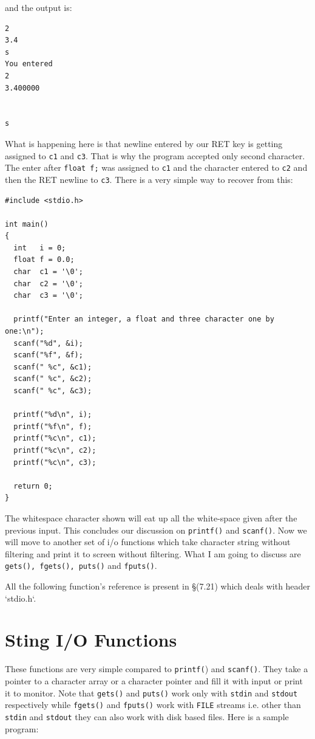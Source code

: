 and the output is:

\begin{Verbatim}[frame=single]
2
3.4
s
You entered
2
3.400000


s
\end{Verbatim}

What is happening here is that newline entered by our RET key is getting
assigned to \texttt{c1} and \texttt{c3}. That is why the program accepted only
second character. The enter after \texttt{float f;} was assigned to \texttt{c1}
and the character entered to \texttt{c2} and then the RET newline to
\texttt{c3}. There is a very simple way to recover from this:

\begin{Verbatim}[frame=single]
#include <stdio.h>

int main()
{
  int   i = 0;
  float f = 0.0;
  char  c1 = '\0';
  char  c2 = '\0';
  char  c3 = '\0';

  printf("Enter an integer, a float and three character one by one:\n");
  scanf("%d", &i);
  scanf("%f", &f);
  scanf(" %c", &c1);
  scanf(" %c", &c2);
  scanf(" %c", &c3);

  printf("%d\n", i);
  printf("%f\n", f);
  printf("%c\n", c1);
  printf("%c\n", c2);
  printf("%c\n", c3);

  return 0;
}
\end{Verbatim}

The whitespace character shown will eat up all the white-space given after the
previous input. This concludes our discussion on \texttt{printf()} and
\texttt{scanf()}. Now we will move to another set of i/o functions which take
character string without filtering and print it to screen without
filtering. What I am going to discuss are \texttt{gets(), fgets(), puts()} and
\texttt{fputs()}.

All the following function's reference is present in \S(7.21) which deals with
header `stdio.h`.

\section{Sting I/O Functions}
These functions are very simple compared to \texttt{printf(}) and
\texttt{scanf()}. They take a pointer to a character array or a character
pointer and fill it with input or print it to monitor. Note that
\texttt{gets()} and \texttt{puts()} work only with \texttt{stdin} and
\texttt{stdout} respectively while \texttt{fgets()} and \texttt{fputs()} work
with \texttt{FILE} streams i.e. other than \texttt{stdin} and \texttt{stdout}
they can also work with disk based files. Here is a sample program:

